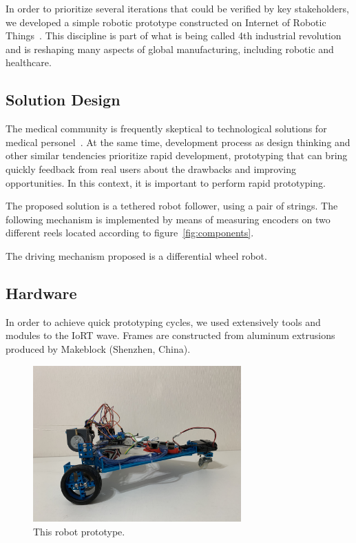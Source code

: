 \documentclass[journal]{IEEEtran}
\begin{document}
In order to prioritize several iterations that could be verified by key stakeholders, we developed a simple robotic prototype constructed on Internet of Robotic Things~\cite{Simoens2018}.  This discipline is part of what is being called 4th industrial revolution and is reshaping many aspects of global manufacturing, including robotic and healthcare.

\subsection{Solution Design}

The medical community is frequently skeptical to technological solutions for medical personel~\cite{Gaggioli2006,Fasola2012,Cherubini2008,Wolpaw2012BraincomputerIP}.  At the same time, development process as design thinking and other similar tendencies prioritize rapid development, prototyping that can bring quickly feedback from real users about the drawbacks and improving opportunities.  In this context, it is important to perform rapid prototyping.

The proposed solution is a tethered robot follower, using a pair of strings.  The following mechanism is implemented by means of measuring encoders on two different reels located according to figure~\ref{fig:components}.

The driving mechanism proposed is a differential wheel robot.

\subsection{Hardware}

In order to achieve quick prototyping cycles, we used extensively tools and modules to the IoRT wave.  Frames are constructed from aluminum extrusions produced by Makeblock (Shenzhen, China).  

\begin{figure}[h!]
\centering
\includegraphics[width=8cm]{images/alpibot1.jpg}
\caption{This robot prototype.}
\label{fig:performance}
\end{figure}
\end{document}
